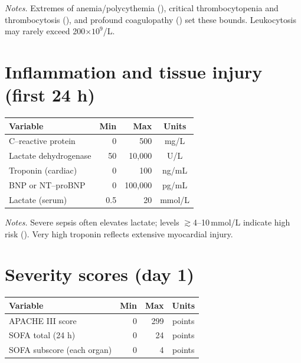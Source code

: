 \noindent\textit{Notes.} Extremes of anemia/polycythemia (\citealt{EJCRIM_SevereAnemia,HighHbMerits}), critical thrombocytopenia and thrombocytosis (\citealt{StatPearlsPlateletTx,PMCThrombocythemia}), and profound coagulopathy (\citealt{INRHighBleeding}) set these bounds. Leukocytosis may rarely exceed 200$\times 10^9$/L.

\vspace{0.75\baselineskip}
\section*{Inflammation and tissue injury (first 24 h)}
\vspace{0.75\baselineskip}
\begin{table}[ht!]\centering\small
\begin{tabular}{lrrc}
\toprule
\textbf{Variable} & \textbf{Min} & \textbf{Max} & \textbf{Units} \\
\midrule
C–reactive protein & 0 & 500 & mg/L \\
Lactate dehydrogenase & 50 & 10{,}000 & U/L \\
Troponin (cardiac) & 0 & 100 & ng/mL \\
BNP or NT–proBNP & 0 & 100{,}000 & pg/mL \\
Lactate (serum) & 0.5 & 20 & mmol/L \\
\bottomrule
\end{tabular}
\end{table}

\noindent\textit{Notes.} Severe sepsis often elevates lactate; levels $\gtrsim$4–10\,mmol/L indicate high risk (\citealt{AAFPSepsisLactate}). Very high troponin reflects extensive myocardial injury.

\vspace{0.75\baselineskip}
\section*{Severity scores (day 1)}
\vspace{0.75\baselineskip}
\begin{table}[ht!]\centering\small
\begin{tabular}{lrrc}
\toprule
\textbf{Variable} & \textbf{Min} & \textbf{Max} & \textbf{Units} \\
\midrule
APACHE III score & 0 & 299 & points \\
SOFA total (24 h) & 0 & 24 & points \\
SOFA subscore (each organ) & 0 & 4 & points \\
\bottomrule
\end{tabular}
\end{table}

